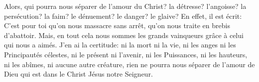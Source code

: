 Alors, qui pourra nous séparer de l’amour du Christ?
	la détresse? l’angoisse? la persécution? la faim? le dénuement? le danger? le glaive?
En effet, il est écrit:
	C’est pour toi qu’on nous massacre sans arrêt,
	qu’on nous traite en brebis d’abattoir.
Mais, en tout cela nous sommes les grands vainqueurs grâce à celui qui nous a aimés.
J’en ai la certitude: ni la mort ni la vie, ni les anges ni les Principautés célestes,
	ni le présent ni l’avenir, ni les Puissances, ni les hauteurs, ni les abîmes,
	ni aucune autre créature, rien ne pourra nous séparer de l’amour de Dieu
		qui est dans le Christ Jésus notre Seigneur.
